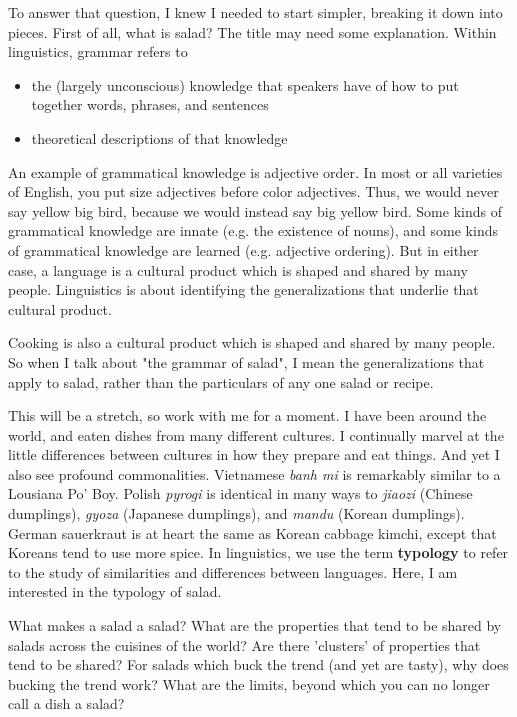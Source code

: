  To answer that question, I knew I needed to start simpler, breaking it down into pieces. First of all, what is salad? 
The title may need some explanation. Within linguistics, grammar refers to

\begin{itemize}
    \item the (largely unconscious) knowledge that speakers have of how to put together words, phrases, and sentences
    \item theoretical descriptions of that knowledge
\end{itemize}

An example of grammatical knowledge is adjective order. In most or all varieties of English, you put size adjectives before color adjectives. Thus, we would never say yellow big bird, because we would instead say big yellow bird. Some kinds of grammatical knowledge are innate (e.g. the existence of nouns), and some kinds of grammatical knowledge are learned (e.g. adjective ordering). But in either case, a language is a cultural product which is shaped and shared by many people. Linguistics is about identifying the generalizations that underlie that cultural product.

Cooking is also a cultural product which is shaped and shared by many people. So when I talk about "the grammar of salad", I mean the generalizations that apply to salad, rather than the particulars of any one salad or recipe.

This will be a stretch, so work with me for a moment. I have been around the world, and eaten dishes from many different cultures. I continually marvel at the little differences between cultures in how they prepare and eat things. And yet I also see profound commonalities. Vietnamese \textit{banh mi} is remarkably similar to a Lousiana Po' Boy. Polish \textit{pyrogi} is identical in many ways to \textit{jiaozi} (Chinese dumplings), \textit{gyoza} (Japanese dumplings), and \textit{mandu} (Korean dumplings). German sauerkraut is at heart the same as Korean cabbage kimchi, except that Koreans tend to use more spice. In linguistics, we use the term \textbf{typology} to refer to the study of similarities and differences between languages. Here, I am interested in the typology of salad.

What makes a salad a salad? What are the properties that tend to be shared by salads across the cuisines of the world? Are there 'clusters' of properties that tend to be shared? For salads which buck the trend (and yet are tasty), why does bucking the trend work? What are the limits, beyond which you can no longer call a dish a salad?

